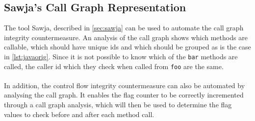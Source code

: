 \subsection{Sawja's Call Graph Representation}
The tool Sawja, described in \cref{sec:sawja} can be used to automate the call graph integrity countermeasure. An analysis of the call graph shows which methods are callable, which should have unique ids and which should be grouped as is the case in \cref{lst:javaorig}. Since it is not possible to know which of the \texttt{bar} methods are called, the caller id which they check when called from \texttt{foo} are the same.\\\\
In addition, the control flow integrity countermeasure can also be automated by analysing the call graph. It enables the flag counter to be correctly incremented through a call graph analysis, which will then be used to determine the flag values to check before and after each method call.
